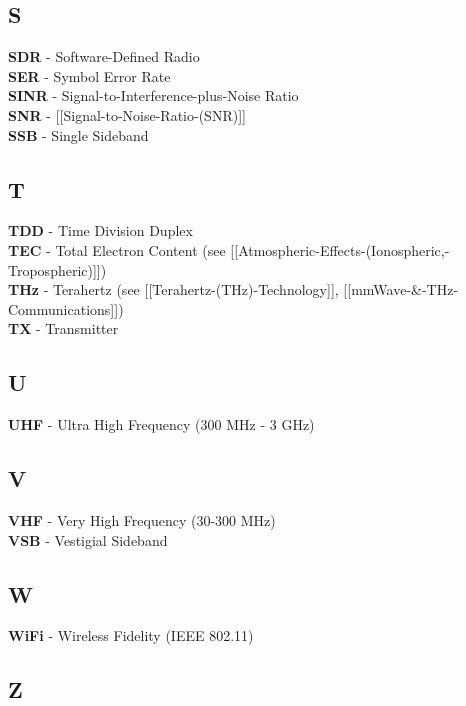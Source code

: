 \subsection{S}\label{sec:acronyms-s}

\textbf{SDR} - Software-Defined Radio\\
\textbf{SER} - Symbol Error Rate\\
\textbf{SINR} - Signal-to-Interference-plus-Noise Ratio\\
\textbf{SNR} - {[}{[}Signal-to-Noise-Ratio-(SNR){]}{]}\\
\textbf{SSB} - Single Sideband

\subsection{T}\label{sec:acronyms-t}

\textbf{TDD} - Time Division Duplex\\
\textbf{TEC} - Total Electron Content (see
{[}{[}Atmospheric-Effects-(Ionospheric,-Tropospheric){]}{]})\\
\textbf{THz} - Terahertz (see {[}{[}Terahertz-(THz)-Technology{]}{]},
{[}{[}mmWave-\&-THz-Communications{]}{]})\\
\textbf{TX} - Transmitter

\subsection{U}\label{sec:acronyms-u}

\textbf{UHF} - Ultra High Frequency (300 MHz - 3 GHz)

\subsection{V}\label{sec:acronyms-v}

\textbf{VHF} - Very High Frequency (30-300 MHz)\\
\textbf{VSB} - Vestigial Sideband

\subsection{W}\label{sec:acronyms-w}

\textbf{WiFi} - Wireless Fidelity (IEEE 802.11)

\subsection{Z}\label{sec:acronyms-z}

